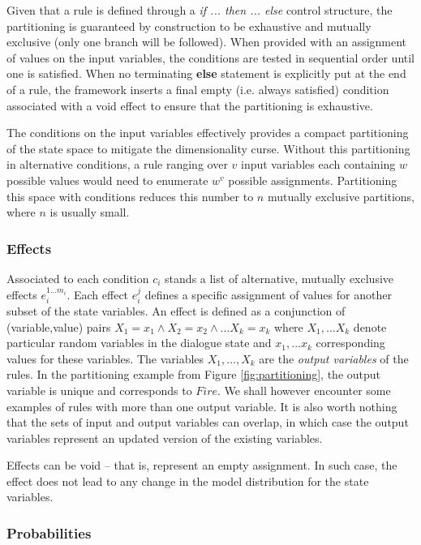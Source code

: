 Given that a rule is defined through a \textit{if ... then ... else} control structure, the partitioning is guaranteed by construction to be exhaustive and mutually exclusive (only one branch will be followed).  When provided with an assignment of values on the input variables, the conditions are tested in sequential order until one is satisfied. When no terminating \textbf{else} statement is explicitly put at the end of a rule, the framework inserts a final empty (i.e. always satisfied) condition associated with a void effect to ensure that the partitioning is exhaustive. 

The conditions on the input variables effectively provides a compact partitioning of the state space to mitigate the dimensionality curse.  Without this partitioning in alternative conditions, a rule ranging over $v$ input variables each containing $w$ possible values would need to enumerate $w^v$ possible assignments.  Partitioning this space with conditions reduces this number to $n$ mutually exclusive partitions, where $n$ is usually small. 


\subsubsection*{Effects}

Associated to each condition $c_i$ stands a list of alternative, mutually exclusive effects $e_i^{1...m_i}$. Each effect $e_i^j$ defines a specific assignment of values for another subset of the state variables.  An effect is defined as a conjunction of (variable,value) pairs $X_1\!=\!x_1 \land X_2\!=\!x_2 \land ... X_k\!=\!x_k$ where $X_1,... X_k$ denote particular random variables in the dialogue state and $x_1,...x_k$ corresponding values for these variables.   The variables $X_1,...,X_k$ are the \textit{output variables} of the rules. In the partitioning example from Figure \ref{fig:partitioning}, the output variable is unique and corresponds to $Fire$. We shall however encounter some examples of rules with more than one output variable. It is also worth nothing that the sets of input and output variables can overlap, in which case the output variables represent an updated version of the existing variables. 

Effects can be void -- that is, represent an empty assignment.  In such case, the effect does not lead to any change in the model distribution for the state variables. 

\subsubsection*{Probabilities}

